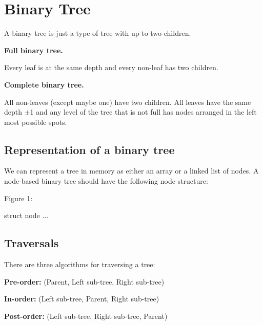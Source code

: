 \documentclass[11pt,a4paper,english]{paper}
\begin{document}
\bigskip


\section{Binary Tree}

A binary tree is just a type of tree with up to two children.

\bigskip

\noindent\textbf{Full binary tree.}

Every leaf is at the same depth and every non-leaf has two children.

\bigskip
\noindent\textbf{Complete binary tree.}

All non-leaves (except maybe one) have two children. All leaves have the same depth $\pm$1 and any level of the tree that is not full has nodes arranged in the left most possible spots.

\subsection{Representation of a binary tree}

We can represent a tree in memory as either an array or a linked list of nodes. A node-based binary tree should have the following node structure:

\bigskip

\begin{bbox}{Figure 1:} {

struct node ...


  }
\end{bbox}

\subsection{Traversals}

There are three algorithms for traversing a tree:

\bigskip

\begin{itemize} {

    \item \textbf{Pre-order:} (Parent, Left sub-tree, Right sub-tree)
    \item \textbf{In-order:} (Left sub-tree, Parent, Right sub-tree)
    \item \textbf{Post-order:} (Left sub-tree, Right sub-tree, Parent)

}\end{itemize}
\end{document}
